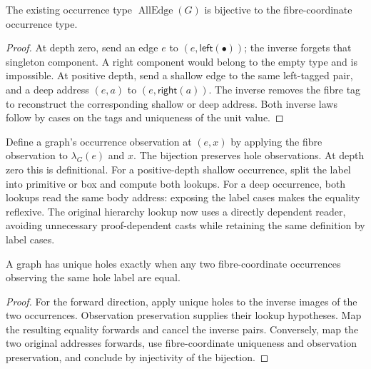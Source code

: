 \begin{lemma}
The existing occurrence type $\operatorname{AllEdge}(G)$ is bijective to the
fibre-coordinate occurrence type.
\end{lemma}
\begin{proof}
At depth zero, send an edge $e$ to $(e,\mathsf{left}(\bullet))$; the inverse
forgets that singleton component. A right component would belong to the empty
type and is impossible. At positive depth, send a shallow edge to the same
left-tagged pair, and a deep address $(e,a)$ to $(e,\mathsf{right}(a))$.
The inverse removes the fibre tag to reconstruct the corresponding shallow or
deep address. Both inverse laws follow by cases on the tags and uniqueness of the unit value.
\end{proof}
Define a graph's occurrence observation at $(e,x)$ by applying the fibre
observation to $\lambda_G(e)$ and $x$.
The bijection preserves hole observations. At depth zero this is definitional.
For a positive-depth shallow occurrence, split the label into primitive or box
and compute both lookups. For a deep occurrence, both lookups read the same
body address: exposing the label cases makes the equality reflexive. The original
hierarchy lookup now uses a directly dependent reader, avoiding unnecessary
proof-dependent casts while retaining the same definition by label cases.

\begin{lemma}
A graph has unique holes exactly when any two fibre-coordinate occurrences
observing the same hole label are equal.
\end{lemma}
\begin{proof}
For the forward direction, apply unique holes to the inverse images of the two
occurrences. Observation preservation supplies their lookup hypotheses. Map
the resulting equality forwards and cancel the inverse pairs. Conversely, map
the two original addresses forwards, use fibre-coordinate uniqueness and
observation preservation, and conclude by injectivity of the bijection.
\end{proof}

